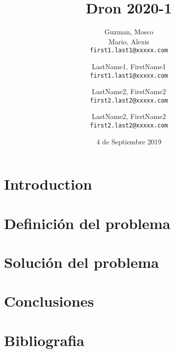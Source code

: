 \documentclass{article}
\title{Dron 2020-1}
\author{
  Guzman, Mosco\\
  Mario, Alexis\\
  \texttt{first1.last1@xxxxx.com}
  \and  
  LastName1, FirstName1\\
  \texttt{first1.last1@xxxxx.com}
  \and
  LastName2, FirstName2\\
  \texttt{first2.last2@xxxxx.com}
  \and
  LastName2, FirstName2\\
  \texttt{first2.last2@xxxxx.com}
}
\date{4 de Septiembre 2019}
\begin{document}
\maketitle

\section{Introduction}
\section{Definición del problema}
\section{Solución del problema}
\section{Conclusiones}
\section{Bibliografia}
\end{document}
